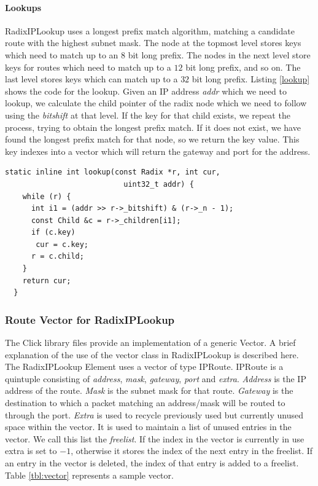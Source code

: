 \documentclass[a4paper,marginparwidth=50pt,marginparsep=10pt]{article}
\begin{document}
\paragraph{Lookups}
RadixIPLookup uses a longest prefix match algorithm, matching a candidate route with the highest subnet mask. The node at the topmost level stores keys which need to match up to an 8 bit long prefix. The nodes in the next level store keys for routes which need to match up to a $12$ bit long prefix, and so on. The last level stores keys which can match up to a $32$ bit long prefix. Listing \ref{lookup} shows the code for the lookup. Given an IP address \emph{addr} which we need to lookup, we calculate the child pointer of the radix node which we need to follow using the \emph{bitshift} at that level. If the key for that child exists, we repeat the process, trying to obtain the longest prefix match. If it does not exist, we have found the longest prefix match for that node, so we return the key value. This key indexes into a vector which will return the gateway and port for the address.
\begin{lstlisting}[caption = The lookup function, label=lookup]
  static inline int lookup(const Radix *r, int cur, 
                           uint32_t addr) {
    while (r) {
      int i1 = (addr >> r->_bitshift) & (r->_n - 1);
      const Child &c = r->_children[i1];
      if (c.key)
       cur = c.key;
      r = c.child;
    }
    return cur;
  }
\end{lstlisting}
\subsubsection{Route Vector for RadixIPLookup}
The Click library files provide an implementation of a generic Vector. A brief explanation of the use of the vector class in RadixIPLookup is described here. The RadixIPLookup Element uses a vector of type IPRoute. IPRoute is a quintuple consisting of \emph{address}, \emph{mask}, \emph{gateway}, \emph{port} and \emph{extra}. \emph{Address} is the IP address of the route. \emph{Mask} is the subnet mask for that route. \emph{Gateway} is the destination to which a packet matching an address/mask will be routed to through the port. \emph{Extra} is used to recycle previously used but currently unused space within the vector. It is used to maintain a list of unused entries in the vector. We call this list the \emph{freelist}. If the index in the vector is currently in use extra is set to $-1$, otherwise it stores the index of the next entry in the freelist. If an entry in the vector is deleted, the index of that entry is added to a freelist. Table \ref{tbl:vector} represents a sample vector.
\end{document}
